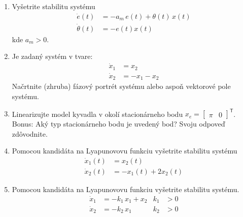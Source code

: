 \documentclass[a4paper, 10pt, ]{article}
\begin{document}
\begin{enumerate}[leftmargin=0pt, labelsep=3mm, itemsep=0pt]

	\item Vyšetrite stabilitu systému
	\begin{align*}
		\dot{e}(t) &= -a_m\,e(t) + \theta(t) \, x(t)  \\
		\dot{\theta}(t) &= -e(t) x(t)
	\end{align*}
	kde $a_m > 0$.



	\item Je zadaný systém v tvare:
		\begin{align*}
			\dot{x}_1 &= x_2 \\
			\dot{x}_2 &= -x_1 - x_2
		\end{align*}
		Načrtnite (zhruba) fázový portrét systému alebo aspoň vektorové pole systému.

		\item Linearizujte model kyvadla v okolí stacionárneho bodu $x_e = \begin{bmatrix} \pi & 0 \end{bmatrix}^\mathsf{T}$. Bonus: Aký typ stacionárneho bodu je uvedený bod? Svoju odpoveď zdôvodnite.



	\item Pomocou kandidáta na Lyapunovovu funkciu vyšetrite stabilitu systému
			\begin{align*}
					\dot{x}_1(t) &=  x_2(t)  \\
					\dot{x}_2(t) &= - x_1(t) + 2 x_2(t)
				\end{align*}



	\item Pomocou kandidáta na Lyapunovovu funkciu vyšetrite stabilitu systému.
	\begin{align*}
	 	\dot{x}_1 &= -k_1\,x_1 + x_2 & k_1 &> 0 \\
	 	\dot{x}_2 &= -k_2\,x_1  & k_2 &> 0
	 \end{align*}




\end{enumerate}
\end{document}
